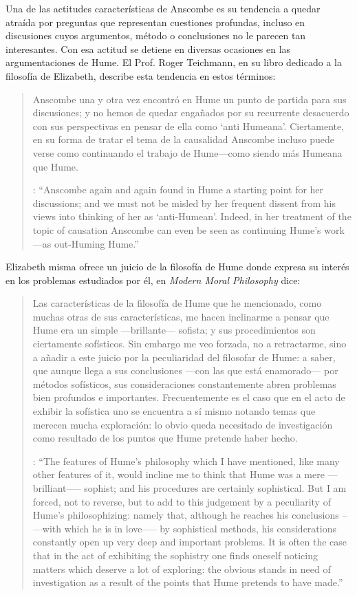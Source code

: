 Una de las actitudes características de Anscombe es su tendencia a quedar atraída por preguntas que representan cuestiones profundas, incluso en discusiones cuyos argumentos, método o conclusiones no le parecen tan interesantes. Con esa actitud se detiene en diversas ocasiones en las argumentaciones de Hume. El Prof. Roger Teichmann, en su libro dedicado a la filosofía de Elizabeth, describe esta tendencia en estos términos: \blockquote[{\cite[177]{teichmann2008ans}}: \enquote{Anscombe again and again found in Hume a starting point for her discussions; and we must not be misled by her frequent dissent from his views into thinking of her as `anti-Humean'. Indeed, in her treatment of the topic of causation Anscombe can even be seen as continuing Hume's work---as out-Huming Hume.}]{Anscombe una y otra vez encontró en Hume un punto de partida para sus discusiones; y no hemos de quedar engañados por su recurrente desacuerdo con sus perspectivas en pensar de ella como `anti Humeana'. Ciertamente, en su forma de tratar el tema de la causalidad Anscombe incluso puede verse como continuando el trabajo de Hume---como siendo más Humeana que Hume.} Elizabeth misma ofrece un juicio de la filosofía de Hume donde expresa su interés en los problemas estudiados por él, en \emph{Modern Moral Philosophy} dice: \blockquote[{\cite[28]{anscombe1981erp:mmph}}: \enquote{The features of Hume’s philosophy which I have mentioned, like many other features of it, would incline me to think that Hume was a mere ---brilliant--— sophist; and his procedures are certainly sophistical. But I am forced, not to reverse, but to add to this judgement by a peculiarity of Hume’s philosophizing: namely that, although he reaches his conclusions --—with which he is in love--— by sophistical methods, his considerations constantly open up very deep and important problems. It is often the case that in the act of exhibiting the sophistry one finds oneself noticing matters which deserve a lot of exploring: the obvious stands in need of investigation as a result of the points that Hume pretends to have made.}]{Las características de la filosofía de Hume que he mencionado, como muchas otras de sus características, me hacen inclinarme a pensar que Hume era un simple ---brillante--- sofista; y sus procedimientos son ciertamente sofísticos. Sin embargo me veo forzada, no a retractarme, sino a añadir a este juicio por la peculiaridad del filosofar de Hume: a saber, que aunque llega a sus conclusiones ---con las que está enamorado--- por métodos sofísticos, sus consideraciones constantemente abren problemas bien profundos e importantes. Frecuentemente es el caso que en el acto de exhibir la sofística uno se encuentra a sí mismo notando temas que merecen mucha exploración: lo obvio queda necesitado de investigación como resultado de los puntos que Hume pretende haber hecho.}

